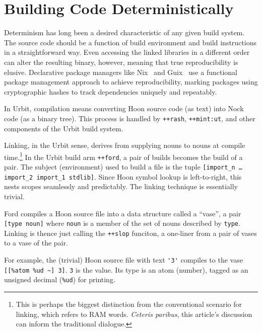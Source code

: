 \documentclass[twoside]{article}
\begin{document}
\section{Building Code Deterministically}

\sloppy
Determinism has long been a desired characteristic of any given build system.  The source code should be a function of build environment and build instructions in a straightforward way.  Even accessing the linked libraries in a different order can alter the resulting binary, however, meaning that true reproducibility is elusive.  Declarative package managers like Nix \citep{Nix}~and Guix \citep{Guix}~use a functional package management approach to achieve reproducibility, marking packages using cryptographic hashes to track dependencies uniquely and repeatably.

In Urbit, compilation means converting Hoon source code (as text) into Nock code (as a binary tree).  This process is handled by \lstinline[style=inlinecode]{++rash}, \lstinline[style=inlinecode]{++mint:ut}, and other components of the Urbit build system.

Linking, in the Urbit sense, derives from supplying nouns to nouns at compile time.\footnote{This is perhaps the biggest distinction from the conventional scenario for linking, which refers to RAM words.  \emph{Ceteris paribus}, this article's discussion can inform the traditional dialogue.}  In the Urbit build arm \lstinline[style=inlinecode]{++ford}, a pair of builds becomes the build of a pair.  The subject (environment) used to build a file is the tuple \lstinline[style=inlinecode]{[import_n … import_2 import_1 stdlib]}.  Since Hoon symbol lookup is left-to-right, this nests scopes seamlessly and predictably.  The linking technique is essentially trivial.

Ford compiles a Hoon source file into a data structure called a “vase”, a pair \lstinline[style=inlinecode]{[type noun]} where \lstinline[style=inlinecode]{noun} is a member of the set of nouns described by \lstinline[style=inlinecode]{type}.  Linking is thence just calling the \lstinline[style=inlinecode]{++slop} funciton, a one-liner from a pair of vases to a vase of the pair.

For example, the (trivial) Hoon source file with text \lstinline[style=inlinecode]{'3'} compiles to the vase \lstinline[style=inlinecode]{[[%atom %ud ~] 3]}.  \lstinline[style=inlinecode]{3} is the value.  Its type is an atom (number), tagged as an unsigned decimal (\lstinline[style=inlinecode]{%ud}) for printing.
\end{document}

